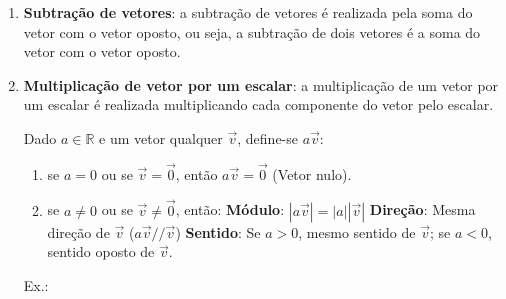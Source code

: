 \documentclass[12pt]{article}
\begin{document}
\begin{enumerate}
\begin{center}
        \end{center}

        \item \textbf{Subtração de vetores}: a subtração de vetores é realizada pela soma do vetor com o vetor oposto, ou seja, a subtração de dois vetores é a soma do vetor com o vetor oposto.
        \item \textbf{Multiplicação de vetor por um escalar}: a multiplicação de um vetor por um escalar é realizada multiplicando cada componente do vetor pelo escalar.
        
        Dado $a \in \mathbb{R}$ e um vetor qualquer $\overrightarrow{v}$, define-se $a \overrightarrow{v}$:
        \begin{enumerate}[label=\alph*)]
            \item se $a=0$ ou se $\overrightarrow{v} = \overrightarrow{0}$, então $a \overrightarrow{v} = \overrightarrow{0}$ (Vetor nulo).
            \item se $a \neq 0$ ou se $\overrightarrow{v} \neq \overrightarrow{0}$, então:
                \subitem            \textbf{Módulo}: $|a\overrightarrow{v}| = |a||\overrightarrow{v}|$
                \subitem           \textbf{Direção}: Mesma direção de $\overrightarrow{v}$ ($a\overrightarrow{v} // \overrightarrow{v}$)
                \subitem           \textbf{Sentido}: Se $a > 0$, mesmo sentido de $\overrightarrow{v}$;
                \subitem  {}se $a < 0$, sentido oposto de $\overrightarrow{v}$.
        \end{enumerate}
        
        \pagebreak
        Ex.:


\end{enumerate}
\end{document}
